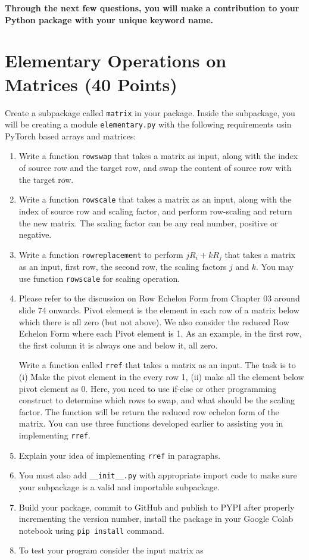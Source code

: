 \documentclass[12pt, xcolor=dvipsnames,svgnames,x11names]{article}
\begin{document}
\textbf{Through the next few questions, you will make a contribution to your Python package with your unique keyword name.}

\section{Elementary Operations on Matrices (40 Points)}

Create a subpackage called \texttt{matrix} in your package. Inside the subpackage, you will be creating a module \texttt{elementary.py} with the following requirements usin PyTorch based arrays and matrices:

\begin{enumerate}
    \item Write a function \texttt{rowswap} that takes a matrix as input, along with the index of source row and the target row, and swap the content of source row with the target row.
    \item Write a function \texttt{rowscale} that takes a matrix as an input, along with the index of source row and scaling factor, and perform row-scaling and return the new matrix. The scaling factor can be any real number, positive or negative.
    \item Write a function \texttt{rowreplacement} to perform $jR_i + kR_j$ that takes a matrix as an input, first row, the second row, the scaling factors $j$ and $k$. You may use function \texttt{rowscale} for scaling operation.
    \item Please refer to the discussion on Row Echelon Form from Chapter 03 around slide 74 onwards. Pivot element is the element in each row of a matrix below which there is all zero (but not above). We also consider the reduced Row Echelon Form where each Pivot element is 1. As an example, in the first row, the first column it is always one and below it, all zero.
    
    Write a function called \texttt{rref} that takes a matrix as an input. The task is to (i) Make the pivot element in the every row 1, (ii) make all the element below pivot element as 0. Here, you need to use if-else or other programming construct to determine which rows to swap, and what should be the scaling factor. The function will be return the reduced row echelon form of the matrix. You can use three functions developed earlier to assisting you in implementing \texttt{rref}.
    \item Explain your idea of implementing \texttt{rref} in paragraphs.
    \item You must also add \texttt{\_\_init\_\_.py} with appropriate import code to make sure your subpackage is a valid and importable subpackage.
    \item Build your package, commit to GitHub and publish to PYPI after properly incrementing the version number, install the package in your Google Colab notebook using \texttt{pip install} command.
    \item To test your program consider the input matrix as 
    

\end{enumerate}
\end{document}
